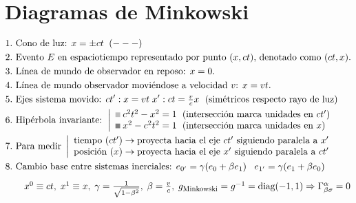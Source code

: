 \section*{Diagramas de Minkowski}
\begin{align*}
    &1. \text{ Cono de luz: } x=\pm ct \;\; (---)\\
    &2. \text{ Evento $E$ en espaciotiempo representado por punto $(x,ct)$, denotado como $(ct,x)$.}\\
    &3. \text{ Línea de mundo de observador en reposo: } x=0.\\
    &4. \text{ Línea de mundo observador moviéndose a velocidad $v$: } x=vt.\\
    &5. \text{ Ejes sistema movido: } ct': x= vt \;x': ct=\tfrac{v}{c}x \; \text{ (simétricos respecto rayo de luz)} \\
    &6. \text{ Hipérbola invariante: }
    \left |
    \begin{array}{l}
    \textcolor{lightgray}{\rule{0.5em}{0,5em}}\; c^2t^2- x^2 = 1\; \text{ (intersección marca unidades en $ct'$)}\\
    \textcolor{gray}{\rule{0.5em}{0,5em}}\; x^2-c^2t^2 = 1\; \text{ (intersección marca unidades en $x$)}  
\end{array}
\right. \\
    &7. \text{ Para medir }
     \left|
\begin{array}{l}
\text{tiempo ($ct'$})\rightarrow \text{proyecta hacia el eje $ct'$ siguiendo paralela a $x'$} \\
\text{posición ($x$)} \rightarrow \text{proyecta hacia el eje $x'$ siguiendo paralela a $ct'$}
\end{array}
\right. \\
&8. \text{ Cambio base entre sistemas inerciales: } e_{0'}=\gamma (e_0 + \beta e_1) \; \; \; e_{1'}=\gamma(e_1+ \beta e_0)
\end{align*}
\vspace{3pt}
$\;\;\;\;\;\;\; x^0 \equiv ct, \; x^1 \equiv x, \; \gamma =\frac{1}{\sqrt{1-\beta^2}}, \;  \beta=\frac{v}{c}, \;  g_{\scalebox{0.8}{Minkowski}}=g^{-1}=\text{diag}(-1,1)\Rightarrow\Gamma^\alpha_{\beta \sigma} = 0$

